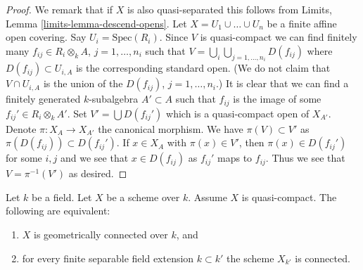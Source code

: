 \begin{proof}
We remark that if $X$ is also quasi-separated this follows from
Limits, Lemma \ref{limits-lemma-descend-opens}. Let
$X = U_1 \cup \ldots \cup U_n$ be a finite affine open
covering. Say $U_i = \text{Spec}(R_i)$.
Since $V$ is quasi-compact we can find finitely many
$f_{ij} \in R_i \otimes_k A$, $j = 1, \ldots, n_i$
such that $V = \bigcup_i \bigcup_{j = 1, \ldots, n_i} D(f_{ij})$
where $D(f_{ij}) \subset U_{i, A}$ is the corresponding standard
open. (We do not claim that $V \cap U_{i, A}$ is the union
of the $D(f_{ij})$, $j = 1, \ldots, n_i$.)
It is clear that we can find a finitely generated $k$-subalgebra
$A' \subset A$ such that $f_{ij}$ is the image of some
$f_{ij}' \in R_i \otimes_k A'$.
Set $V' = \bigcup D(f_{ij}')$ which is a quasi-compact open of $X_{A'}$.
Denote $\pi : X_A \to X_{A'}$ the canonical morphism.
We have $\pi(V) \subset V'$ as $\pi(D(f_{ij})) \subset D(f_{ij}')$.
If $x \in X_A$ with $\pi(x) \in V'$, then $\pi(x) \in D(f_{ij}')$
for some $i, j$ and we see that $x \in D(f_{ij})$ as $f_{ij}'$
maps to $f_{ij}$. Thus we see that $V = \pi^{-1}(V')$ as desired.
\end{proof}

\begin{lemma}
\label{lemma-characterize-geometrically-connected-quasi-compact}
Let $k$ be a field. Let $X$ be a scheme over $k$.
Assume $X$ is quasi-compact. The following are
equivalent:
\begin{enumerate}
\item $X$ is geometrically connected over $k$, and
\item for every finite separable field extension $k \subset k'$
the scheme $X_{k'}$ is connected.
\end{enumerate}
\end{lemma}

